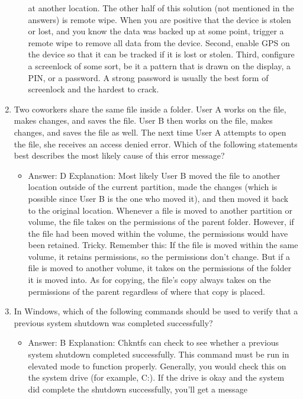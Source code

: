 \documentclass{article}
\begin{document}
\begin{enumerate}
\begin{itemize}
at another location. The other half of this solution (not mentioned in the answers) is
remote wipe. When you are positive that the device is stolen or lost, and you know the
data was backed up at some point, trigger a remote wipe to remove all data from the
device. Second, enable GPS on the device so that it can be tracked if it is lost or stolen.
Third, configure a screenlock of some sort, be it a pattern that is drawn on the display,
a PIN, or a password. A strong password is usually the best form of screenlock and
the hardest to crack.
    \end{itemize}
    \item Two coworkers share the same file inside a folder. User A works on
the file, makes changes, and saves the file. User B then works on
the file, makes changes, and saves the file as well. The next time
User A attempts to open the file, she receives an access denied
error. Which of the following statements best describes the most
likely cause of this error message?
    \begin{itemize}
        \item Answer: D
Explanation: Most likely User B moved the file to another location outside of the current
partition, made the changes (which is possible since User B is the one who moved
it), and then moved it back to the original location. Whenever a file is moved to another
partition or volume, the file takes on the permissions of the parent folder. However, if
the file had been moved within the volume, the permissions would have been retained.
Tricky. Remember this: If the file is moved within the same volume, it retains permissions,
so the permissions don’t change. But if a file is moved to another volume, it
takes on the permissions of the folder it is moved into. As for copying, the file’s copy
always takes on the permissions of the parent regardless of where that copy is placed.
    \end{itemize}
    \item In Windows, which of the following commands should be used
to verify that a previous system shutdown was completed
successfully?
    \begin{itemize}
        \item Answer: B
Explanation: Chkntfs can check to see whether a previous system shutdown completed
successfully. This command must be run in elevated mode to function properly.
Generally, you would check this on the system drive (for example, C:). If the drive is
okay and the system did complete the shutdown successfully, you’ll get a message

\end{itemize}
\end{enumerate}
\end{document}
